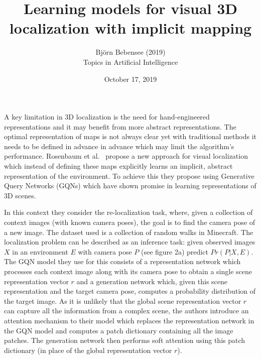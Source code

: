 \documentclass[12pt]{article}
\begin{document}
 
 
\title{Learning models for visual 3D localization with implicit mapping}
\author{Bj\"orn Bebensee (2019)\\ %
Topics in Artificial Intelligence}
\date{October 17, 2019}
\maketitle

\noindent
A key limitation in 3D localization is the need for hand-engineered representations and it may benefit from more abstract representations. The optimal representation of maps is not always clear yet with traditional methods it needs to be defined in advance in advance which may limit the algorithm's performance. Rosenbaum et al.~\cite{rosenbaum} propose a new approach for visual localization which instead of defining these maps explicitly learns an implicit, abstract representation of the environment. To achieve this they propose using Generative Query Networks (GQNs) which have shown promise in learning representations of 3D scenes. 

In this context they consider the re-localization task, where, given a collection of context images (with known camera poses), the goal is to find the camera pose of a new image. The dataset used is a collection of random walks in Minecraft. The localization problem can be described as an inference task: given observed images $X$ in an environment $E$ with camera pose $P$ (see figure 2a) predict $Pr(P|X,E)$. The GQN model they use for this consists of a representation network which processes each context image along with its camera pose to obtain a single scene representation vector $r$ and a generation network which, given this scene representation and the target camera pose, computes a probability distribution of the target image. As it is unlikely that the global scene representation vector $r$ can capture all the information from a complex scene, the authors introduce an attention mechanism to their model which replaces the representation network in the GQN model and computes a patch dictionary containing all the image patches. The generation network then performs soft attention using this patch dictionary (in place of the global representation vector $r$).
\end{document}
